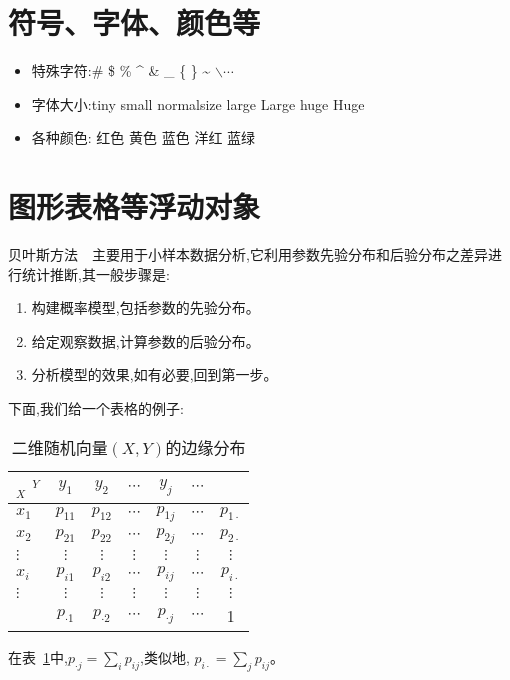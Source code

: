 \documentclass[11pt,a4paper,titlepage]{article}
\begin{document}
\section{符号、字体、颜色等}
\begin{itemize}
\item 特殊字符:\# \$ \% \^{} \& \_ \{ \} \~{} $\backslash \cdots$
\item 字体大小:{\tiny tiny} {\small small} {\normalsize normalsize}
{\large large} {\Large Large} {\huge huge} {\Huge Huge}
\item 各种颜色:{\color{red} 红色} {\color{yellow} 黄色} {\color{blue} 蓝色}
{\color{magenta} 洋红} {\color{cyan} 蓝绿}
\end{itemize}

\section{图形表格等浮动对象}
贝叶斯方法~\cite{Gelman}~主要用于小样本数据分析,它利用参数先验分布和后验分布之差异进行统计推断,其一般步骤是:
\begin{enumerate}
\item 构建概率模型,包括参数的先验分布。
\item 给定观察数据,计算参数的后验分布。
\item 分析模型的效果,如有必要,回到第一步。
\end{enumerate}
下面,我们给一个表格的例子:
\begin{center}
\begin{table}[!h]%
\centering
\caption{二维随机向量$(X,Y)$的边缘分布}
\begin{tabular}{l|ccccc|c}
$_X$\hspace{3mm} $^Y$&$y_1$&$y_2$&$\cdots$&$y_j$&$\cdots$\\
\hline
$x_1$ &$p_{11}$&$p_{12}$&$\cdots$&$p_{1j}$&$\cdots$&$p_{1\cdot}$\\
$x_2$ &$p_{21}$&$p_{22}$&$\cdots$&$p_{2j}$&$\cdots$&$p_{2\cdot}$\\
$\vdots$&$\vdots$&$\vdots$&$\vdots$&$\vdots$&$\vdots$&$\vdots$ \\
$x_i$
&$p_{i1}$&$p_{i2}$&$\cdots$&$p_{ij}$&$\cdots$&$p_{i\cdot}$\\
$\vdots$&$\vdots$&$\vdots$&$\vdots$&$\vdots$&$\vdots$&$\vdots$ \\
\hline
&$p_{\cdot 1}$&$p_{\cdot 2}$&$\cdots$&$p_{\cdot j}$&$\cdots$&1
\label{marginal distribution}
\end{tabular}
\end{table}
\end{center}
在表~\ref{marginal distribution}中,$p_{\cdot j}=\sum\limits_i p_{ij}$,类似地,
$ p_{i\cdot}=\sum\limits_j p_{ij}$。
\end{document}
